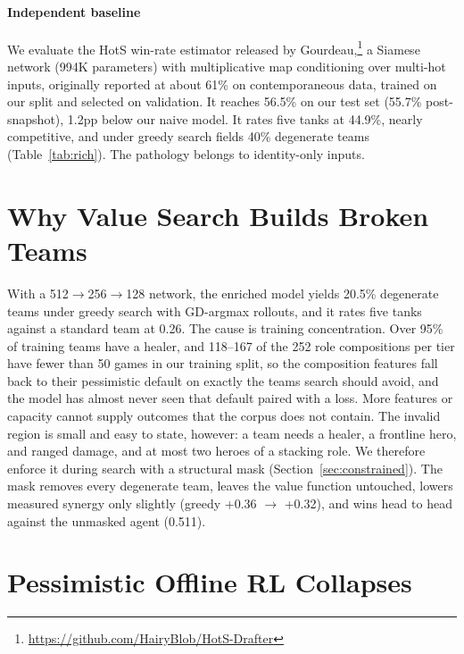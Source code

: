 \documentclass[journal]{IEEEtran}
\begin{document}
\paragraph{Independent baseline}
\label{sec:gourdeau}
We evaluate the HotS win-rate estimator released by Gourdeau,\footnote{\url{https://github.com/HairyBlob/HotS-Drafter}} a Siamese network (994K parameters) with multiplicative map conditioning over multi-hot inputs, originally reported at about 61\% on contemporaneous data, trained on our split and selected on validation. It reaches 56.5\% on our test set (55.7\% post-snapshot), 1.2pp below our naive model. It rates five tanks at 44.9\%, nearly competitive, and under greedy search fields 40\% degenerate teams (Table~\ref{tab:rich}). The pathology belongs to identity-only inputs.

\section{Why Value Search Builds Broken Teams}
\label{sec:synth}

With a 512$\to$256$\to$128 network, the enriched model yields 20.5\% degenerate teams under greedy search with GD-argmax rollouts, and it rates five tanks against a standard team at 0.26. The cause is training concentration. Over 95\% of training teams have a healer, and 118--167 of the 252 role compositions per tier have fewer than 50 games in our training split, so the composition features fall back to their pessimistic default on exactly the teams search should avoid, and the model has almost never seen that default paired with a loss. More features or capacity cannot supply outcomes that the corpus does not contain. The invalid region is small and easy to state, however: a team needs a healer, a frontline hero, and ranged damage, and at most two heroes of a stacking role. We therefore enforce it during search with a structural mask (Section~\ref{sec:constrained}). The mask removes every degenerate team, leaves the value function untouched, lowers measured synergy only slightly (greedy +0.36 $\to$ +0.32), and wins head to head against the unmasked agent (0.511).

\section{Pessimistic Offline RL Collapses}
\label{sec:cql}
\end{document}
